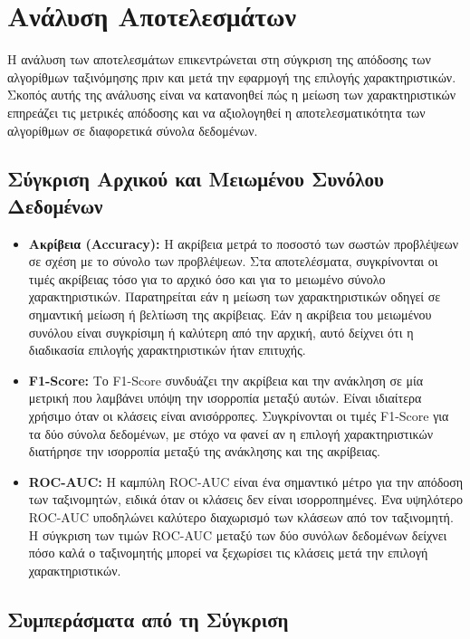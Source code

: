 \documentclass[a4paper,12pt]{article}
\begin{document}
\section{Ανάλυση Αποτελεσμάτων}
Η ανάλυση των αποτελεσμάτων επικεντρώνεται στη σύγκριση της απόδοσης των αλγορίθμων ταξινόμησης πριν και μετά την εφαρμογή της επιλογής χαρακτηριστικών. Σκοπός αυτής της ανάλυσης είναι να κατανοηθεί πώς η μείωση των χαρακτηριστικών επηρεάζει τις μετρικές απόδοσης και να αξιολογηθεί η αποτελεσματικότητα των αλγορίθμων σε διαφορετικά σύνολα δεδομένων.

\subsection{Σύγκριση Αρχικού και Μειωμένου Συνόλου Δεδομένων}

\begin{itemize}
    \item \textbf{Ακρίβεια (Accuracy):} 
    Η ακρίβεια μετρά το ποσοστό των σωστών προβλέψεων σε σχέση με το σύνολο των προβλέψεων. Στα αποτελέσματα, συγκρίνονται οι τιμές ακρίβειας τόσο για το αρχικό όσο και για το μειωμένο σύνολο χαρακτηριστικών.
    Παρατηρείται εάν η μείωση των χαρακτηριστικών οδηγεί σε σημαντική μείωση ή βελτίωση της ακρίβειας. Εάν η ακρίβεια του μειωμένου συνόλου είναι συγκρίσιμη ή καλύτερη από την αρχική, αυτό δείχνει ότι η διαδικασία επιλογής χαρακτηριστικών ήταν επιτυχής.
    
    \item \textbf{F1-Score:}
    Το F1-Score συνδυάζει την ακρίβεια και την ανάκληση σε μία μετρική που λαμβάνει υπόψη την ισορροπία μεταξύ αυτών. Είναι ιδιαίτερα χρήσιμο όταν οι κλάσεις είναι ανισόρροπες.
    Συγκρίνονται οι τιμές F1-Score για τα δύο σύνολα δεδομένων, με στόχο να φανεί αν η επιλογή χαρακτηριστικών διατήρησε την ισορροπία μεταξύ της ανάκλησης και της ακρίβειας.
    
    \item \textbf{ROC-AUC:}
    Η καμπύλη ROC-AUC είναι ένα σημαντικό μέτρο για την απόδοση των ταξινομητών, ειδικά όταν οι κλάσεις δεν είναι ισορροπημένες. Ένα υψηλότερο ROC-AUC υποδηλώνει καλύτερο διαχωρισμό των κλάσεων από τον ταξινομητή.
    Η σύγκριση των τιμών ROC-AUC μεταξύ των δύο συνόλων δεδομένων δείχνει πόσο καλά ο ταξινομητής μπορεί να ξεχωρίσει τις κλάσεις μετά την επιλογή χαρακτηριστικών.
\end{itemize}

\subsection{Συμπεράσματα από τη Σύγκριση}
\end{document}

